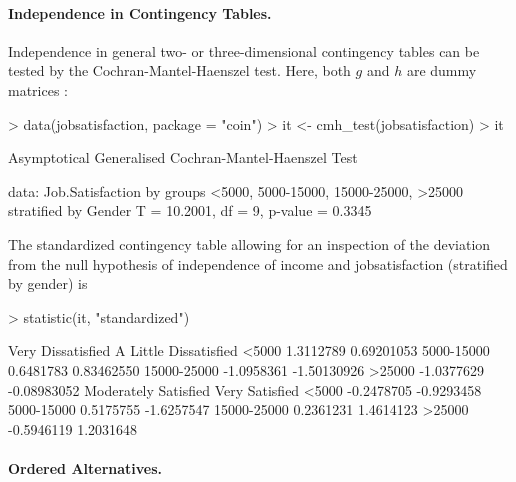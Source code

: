 \documentclass[letter]{article}
\begin{document}
\paragraph{Independence in Contingency Tables.}

Independence in general two- or three-dimensional contingency tables can be
tested by the Cochran-Mantel-Haenszel test. Here, both $g$ and $h$ are dummy
matrices \citep[example data from][Table 7.8, page 288]{Agresti2002}:

\begin{Schunk}
\begin{Sinput}
> data(jobsatisfaction, package = "coin")
> it <- cmh_test(jobsatisfaction)
> it
\end{Sinput}
\begin{Soutput}
	Asymptotical Generalised Cochran-Mantel-Haenszel Test

data:  Job.Satisfaction by
	 groups <5000, 5000-15000, 15000-25000, >25000 
	 stratified by Gender 
T = 10.2001, df = 9, p-value = 0.3345
\end{Soutput}
\end{Schunk}

The standardized contingency table allowing for an inspection of the
deviation from the null hypothesis of independence of income and
jobsatisfaction (stratified by gender) is 
\begin{Schunk}
\begin{Sinput}
> statistic(it, "standardized")
\end{Sinput}
\begin{Soutput}
            Very Dissatisfied A Little Dissatisfied
<5000               1.3112789            0.69201053
5000-15000          0.6481783            0.83462550
15000-25000        -1.0958361           -1.50130926
>25000             -1.0377629           -0.08983052
            Moderately Satisfied Very Satisfied
<5000                 -0.2478705     -0.9293458
5000-15000             0.5175755     -1.6257547
15000-25000            0.2361231      1.4614123
>25000                -0.5946119      1.2031648
\end{Soutput}
\end{Schunk}

\paragraph{Ordered Alternatives.}
\end{document}
